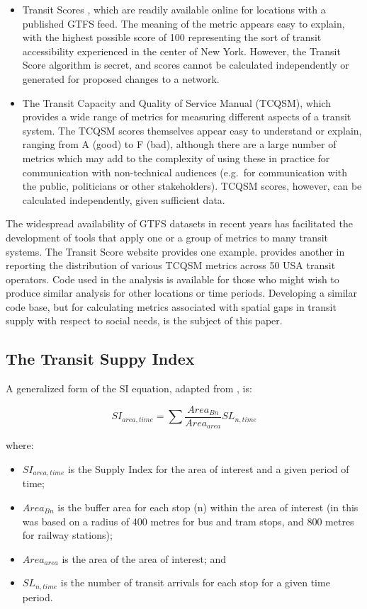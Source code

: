 \documentclass[preprint, 3p,
authoryear]{elsarticle} %
\begin{document}
\begin{itemize}
\item
  Transit Scores \citep{WalkScore:2023tg}, which are readily available
  online for locations with a published GTFS feed. The meaning of the
  metric appears easy to explain, with the highest possible score of 100
  representing the sort of transit accessibility experienced in the
  center of New York. However, the Transit Score algorithm is secret,
  and scores cannot be calculated independently or generated for
  proposed changes to a network.
\item
  The Transit Capacity and Quality of Service Manual (TCQSM), which
  provides a wide range of metrics for measuring different aspects of a
  transit system. The TCQSM scores themselves appear easy to understand
  or explain, ranging from A (good) to F (bad), although there are a
  large number of metrics which may add to the complexity of using these
  in practice for communication with non-technical audiences (e.g.~for
  communication with the public, politicians or other stakeholders).
  TCQSM scores, however, can be calculated independently, given
  sufficient data.
\end{itemize}

The widespread availability of GTFS datasets in recent years has
facilitated the development of tools that apply one or a group of
metrics to many transit systems. The Transit Score website provides one
example. \citet{Wong:2013aa} provides another in reporting the
distribution of various TCQSM metrics across 50 USA transit operators.
Code used in the \citet{Wong:2013aa} analysis is available for those who
might wish to produce similar analysis for other locations or time
periods. Developing a similar code base, but for calculating metrics
associated with spatial gaps in transit supply with respect to social
needs, is the subject of this paper.

\subsection{The Transit Suppy Index}\label{the-transit-suppy-index}

A generalized form of the SI equation, adapted from
\citet{currie2010identifying}, is:

\[SI_{area, time} = \sum{\frac{Area_{Bn}}{Area_{area}}SL_{n, time}}\]

where:

\begin{itemize}
\item
  \(SI_{area, time}\) is the Supply Index for the area of interest and a
  given period of time;
\item
  \(Area_{Bn}\) is the buffer area for each stop (n) within the area of
  interest (in \citet{currie2010identifying} this was based on a radius
  of 400 metres for bus and tram stops, and 800 metres for railway
  stations);
\item
  \(Area_{area}\) is the area of the area of interest; and
\item
  \(SL_{n,time}\) is the number of transit arrivals for each stop for a
  given time period.
\end{itemize}
\end{document}
